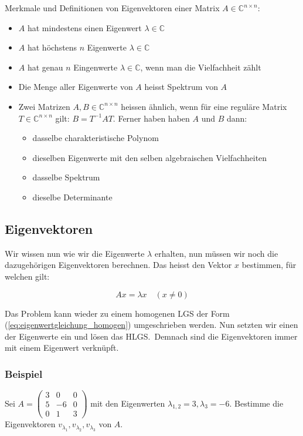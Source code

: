 \vspace{1\baselineskip}

Merkmale und Definitionen von Eigenvektoren einer Matrix \( A \in \mathbb{C}^{n \times n} \):

\begin{itemize}
    \item \( A \) hat mindestens einen Eigenwert \( \lambda \in \mathbb{C} \)
    \item \( A \) hat höchstens \( n \) Eigenwerte \( \lambda \in \mathbb{C} \)
    \item \( A \) hat genau \( n \) Eingenwerte \( \lambda \in \mathbb{C} \), wenn man die Vielfachheit zählt
    \item Die Menge aller Eigenwerte von \( A \) heisst Spektrum von \( A \) 
    \item Zwei Matrizen \( A, B \in \mathbb{C}^{n \times n} \) heissen ähnlich, wenn für eine reguläre Matrix \( T \in \mathbb{C}^{n \times n} \) gilt: \( B = T^{-1} A T \). Ferner haben haben \( A \) und \( B \) dann:
    \begin{itemize}
        \item dasselbe charakteristische Polynom
        \item dieselben Eigenwerte mit den selben algebraischen Vielfachheiten
        \item dasselbe Spektrum
        \item dieselbe Determinante
    \end{itemize}
\end{itemize}

\subsection{Eigenvektoren}

Wir wissen nun wie wir die Eigenwerte \( \lambda \) erhalten, nun müssen wir noch die dazugehörigen Eigenvektoren berechnen. Das heisst den Vektor \( x \) bestimmen, für welchen gilt:

\begin{equation*}
    Ax = \lambda x \quad (x \neq 0)
\end{equation*}

Das Problem kann wieder zu einem homogenen LGS der Form (\ref{eq:eigenwertgleichung_homogen}) umgeschrieben werden. Nun setzten wir einen der Eigenwerte ein und lösen das HLGS.\ Demnach sind die Eigenvektoren immer mit einem Eigenwert verknüpft.

\subsubsection*{Beispiel}
Sei \( A = \begin{pmatrix} 3 & 0 & 0 \\ 5 & -6 & 0 \\ 0 & 1 & 3 \end{pmatrix} \) mit den Eigenwerten \( \lambda_{1,2} = 3, \lambda_3 = -6 \). Bestimme die Eigenvektoren \( v_{\lambda_1}, v_{\lambda_2}, v_{\lambda_3} \) von \( A \).

